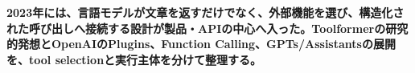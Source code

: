 \noindent\textbf{2023年には、言語モデルが文章を返すだけでなく、外部機能を選び、構造化された呼び出しへ接続する設計が製品・APIの中心へ入った。Toolformerの研究的発想とOpenAIのPlugins、Function Calling、GPTs/Assistantsの展開を、tool selectionと実行主体を分けて整理する。}\autocite{src-150e07b331df,src-4de1cea0a896,src-6b76b870b4ae,src-97786632d087,src-e17d0bf10781}
